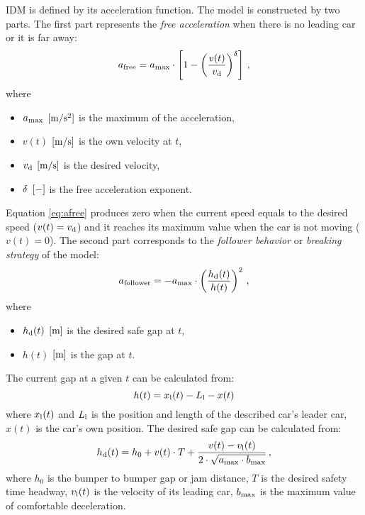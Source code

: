 		IDM is defined by its acceleration function. The model is constructed by two parts. The first part represents the \textit{free acceleration} when there is no leading car or it is far away:
		\begin{equation}
			a_{\rm free}=a_{\rm max}\cdot \left [ 1 - \left ( \frac{v(t)}{v_{\rm d}} \right )^{\rm \delta} \right ]\,,
			\label{eq:afree}
		\end{equation}
		where
		\begin{itemize}
			\item $a_{\rm max}$ $\rm [m/s^2]$ is the maximum of the acceleration,
			\item $v(t)$ $\rm [m/s]$ is the own velocity at $t$,
			\item $v_{\rm d}$ $\rm [m/s]$ is the desired velocity,
			\item $\rm \delta$ $\rm [-]$ is the free acceleration exponent.
		\end{itemize}
		Equation \ref{eq:afree} produces zero when the current speed equals to the desired speed ($v(t)=v_{\rm d}$) and it reaches its maximum value when the car is not moving ($v(t)=0$).
		The second part corresponds to the \textit{follower behavior} or \textit{breaking strategy} of the model:
		\begin{equation}
			a_{\rm follower}=-a_{\rm max}\cdot \left ( \frac{h_{\rm d}(t)}{h(t)} \right )^2\,,
			\label{eq:afollower}
		\end{equation}
		where
		\begin{itemize}
			\item $h_{\rm d}(t)$ $\rm [m]$ is the desired safe gap at $t$,
			\item $h(t)$ $\rm [m]$ is the gap at $t$.
		\end{itemize}
		The current gap at a given $t$ can be calculated from:
		\begin{equation}
			h(t)=x_{\rm l}(t)-L_{\rm l} - x(t)
		\end{equation}
		where $x_{\rm l}(t)$ and $L_{\rm l}$ is the position and length of the described car's leader car, $x(t)$ is the car's own position.
		The desired safe gap can be calculated from:
		\begin{equation}
			h_{\rm d}(t)=h_0 + v(t)\cdot T + \frac{v(t)-v_{\rm l}(t)}{2\cdot \sqrt{a_{\rm max}\cdot b_{\rm max}}}\,,
		\end{equation}
		where $h_0$ is the bumper to bumper gap or jam distance, $T$ is the desired safety time headway, $v_{\rm l}(t)$ is the velocity of its leading car, $b_{\rm max}$ is the maximum value of comfortable deceleration.

